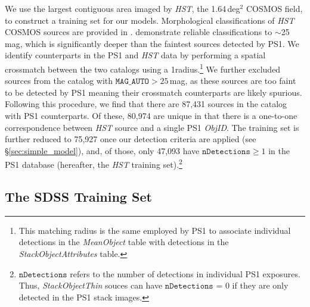 \documentclass[twocolumn, dvipdfmx]{aastex62}
\begin{document}
We use the largest contiguous area imaged by \textit{HST}, the 1.64\,deg$^2$
COSMOS field, to construct a training set for our models. Morphological
classifications of \textit{HST} COSMOS sources are provided in
\citet{Leauthaud07}. \citeauthor{Leauthaud07} demonstrate reliable
classifications to $\sim$25\,mag, which is significantly deeper than the
faintest sources detected by PS1. We identify counterparts in the PS1 and
\textit{HST} data by performing a spatial crossmatch between the two catalogs
using a 1\arcsec radius.\footnote{This matching radius is the same employed
by PS1 to associate individual detections in the \textit{MeanObject} table
with detections in the \textit{StackObjectAttributes} table.} We further
excluded sources from the \citet{Leauthaud07} catalog with
$\texttt{MAG\_AUTO} > 25$\,mag, as these sources are too faint to be detected
by PS1 meaning their crossmatch counterparts are likely spurious. Following
this procedure, we find that there are 87,431 sources in the
\citet{Leauthaud07} catalog with PS1 counterparts. Of these, 80,974 are
unique in that there is a one-to-one correspondence between \textit{HST}
source and a single PS1 \textit{ObjID}. The training set is further reduced
to 75,927 once our detection criteria are applied (see
\S\ref{sec:simple_model}), and, of those, only 47,093 have
$\texttt{nDetections} \ge 1$ in the PS1 database (hereafter, the \textit{HST}
training set).\footnote{$\texttt{nDetections}$ refers to the number of
detections in individual PS1 exposures. Thus, \textit{StackObjectThin} souces
can have $\texttt{nDetections}$ = 0 if they are only detected in the PS1
stack images.}

\subsection{The SDSS Training Set}\label{sec:sdss}
\end{document}
